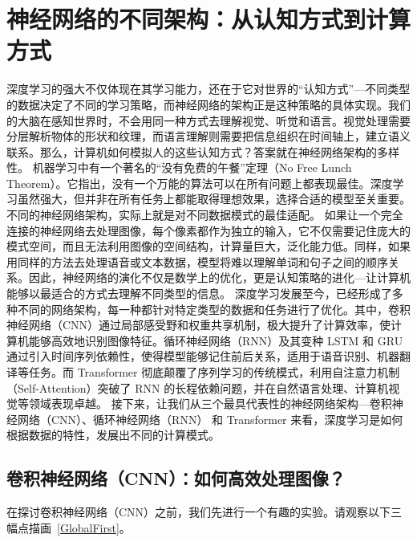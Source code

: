 \section{神经网络的不同架构：从认知方式到计算方式}



深度学习的强大不仅体现在其学习能力，还在于它对世界的“认知方式”---不同类型的数据决定了不同的学习策略，而神经网络的架构正是这种策略的具体实现。我们的大脑在感知世界时，不会用同一种方式去理解视觉、听觉和语言。视觉处理需要分层解析物体的形状和纹理，而语言理解则需要把信息组织在时间轴上，建立语义联系。那么，计算机如何模拟人的这些认知方式？答案就在神经网络架构的多样性。
机器学习中有一个著名的“没有免费的午餐”定理（No Free Lunch Theorem）。它指出，没有一个万能的算法可以在所有问题上都表现最佳。深度学习虽然强大，但并非在所有任务上都能取得理想效果，选择合适的模型至关重要。不同的神经网络架构，实际上就是对不同数据模式的最佳适配。
如果让一个完全连接的神经网络去处理图像，每个像素都作为独立的输入，它不仅需要记住庞大的模式空间，而且无法利用图像的空间结构，计算量巨大，泛化能力低。同样，如果用同样的方法去处理语音或文本数据，模型将难以理解单词和句子之间的顺序关系。因此，神经网络的演化不仅是数学上的优化，更是认知策略的进化---让计算机能够以最适合的方式去理解不同类型的信息。
深度学习发展至今，已经形成了多种不同的网络架构，每一种都针对特定类型的数据和任务进行了优化。其中，卷积神经网络（CNN）通过局部感受野和权重共享机制，极大提升了计算效率，使计算机能够高效地识别图像特征。循环神经网络（RNN）及其变种 LSTM 和 GRU 通过引入时间序列依赖性，使得模型能够记住前后关系，适用于语音识别、机器翻译等任务。而 Transformer 彻底颠覆了序列学习的传统模式，利用自注意力机制（Self-Attention）突破了 RNN 的长程依赖问题，并在自然语言处理、计算机视觉等领域表现卓越。
接下来，让我们从三个最具代表性的神经网络架构---卷积神经网络（CNN）、循环神经网络（RNN） 和 Transformer 来看，深度学习是如何根据数据的特性，发展出不同的计算模式。
 \subsection{ 卷积神经网络（CNN）：如何高效处理图像？}
 在探讨卷积神经网络（CNN）之前，我们先进行一个有趣的实验。请观察以下三幅点描画~\ref{GlobalFirst}。

